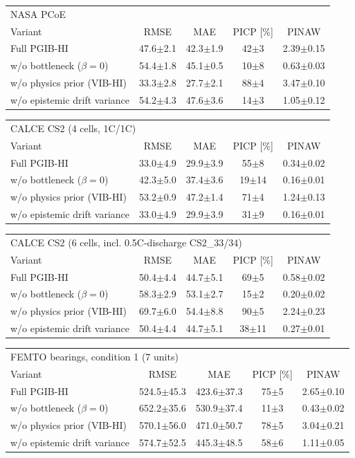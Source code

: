 \begin{tabular}{l c c c c}
\hline
\multicolumn{5}{l}{NASA PCoE}\\
 Variant & RMSE & MAE & PICP [\%] & PINAW \\
\hline
Full PGIB-HI & 47.6$\pm$2.1 & 42.3$\pm$1.9 & 42$\pm$3 & 2.39$\pm$0.15 \\
w/o bottleneck ($\beta=0$) & 54.4$\pm$1.8 & 45.1$\pm$0.5 & 10$\pm$8 & 0.63$\pm$0.03 \\
w/o physics prior (VIB-HI) & 33.3$\pm$2.8 & 27.7$\pm$2.1 & 88$\pm$4 & 3.47$\pm$0.10 \\
w/o epistemic drift variance & 54.2$\pm$4.3 & 47.6$\pm$3.6 & 14$\pm$3 & 1.05$\pm$0.12 \\
\hline
\end{tabular}
\begin{tabular}{l c c c c}
\hline
\multicolumn{5}{l}{CALCE CS2 (4 cells, 1C/1C)}\\
 Variant & RMSE & MAE & PICP [\%] & PINAW \\
\hline
Full PGIB-HI & 33.0$\pm$4.9 & 29.9$\pm$3.9 & 55$\pm$8 & 0.34$\pm$0.02 \\
w/o bottleneck ($\beta=0$) & 42.3$\pm$5.0 & 37.4$\pm$3.6 & 19$\pm$14 & 0.16$\pm$0.01 \\
w/o physics prior (VIB-HI) & 53.2$\pm$0.9 & 47.2$\pm$1.4 & 71$\pm$4 & 1.24$\pm$0.13 \\
w/o epistemic drift variance & 33.0$\pm$4.9 & 29.9$\pm$3.9 & 31$\pm$9 & 0.16$\pm$0.01 \\
\hline
\end{tabular}
\begin{tabular}{l c c c c}
\hline
\multicolumn{5}{l}{CALCE CS2 (6 cells, incl. 0.5C-discharge CS2\_33/34)}\\
 Variant & RMSE & MAE & PICP [\%] & PINAW \\
\hline
Full PGIB-HI & 50.4$\pm$4.4 & 44.7$\pm$5.1 & 69$\pm$5 & 0.58$\pm$0.02 \\
w/o bottleneck ($\beta=0$) & 58.3$\pm$2.9 & 53.1$\pm$2.7 & 15$\pm$2 & 0.20$\pm$0.02 \\
w/o physics prior (VIB-HI) & 69.7$\pm$6.0 & 54.4$\pm$8.8 & 90$\pm$5 & 2.24$\pm$0.23 \\
w/o epistemic drift variance & 50.4$\pm$4.4 & 44.7$\pm$5.1 & 38$\pm$11 & 0.27$\pm$0.01 \\
\hline
\end{tabular}
\begin{tabular}{l c c c c}
\hline
\multicolumn{5}{l}{FEMTO bearings, condition 1 (7 units)}\\
 Variant & RMSE & MAE & PICP [\%] & PINAW \\
\hline
Full PGIB-HI & 524.5$\pm$45.3 & 423.6$\pm$37.3 & 75$\pm$5 & 2.65$\pm$0.10 \\
w/o bottleneck ($\beta=0$) & 652.2$\pm$35.6 & 530.9$\pm$37.4 & 11$\pm$3 & 0.43$\pm$0.02 \\
w/o physics prior (VIB-HI) & 570.1$\pm$56.0 & 471.0$\pm$50.7 & 78$\pm$5 & 3.04$\pm$0.21 \\
w/o epistemic drift variance & 574.7$\pm$52.5 & 445.3$\pm$48.5 & 58$\pm$6 & 1.11$\pm$0.05 \\
\hline
\end{tabular}
